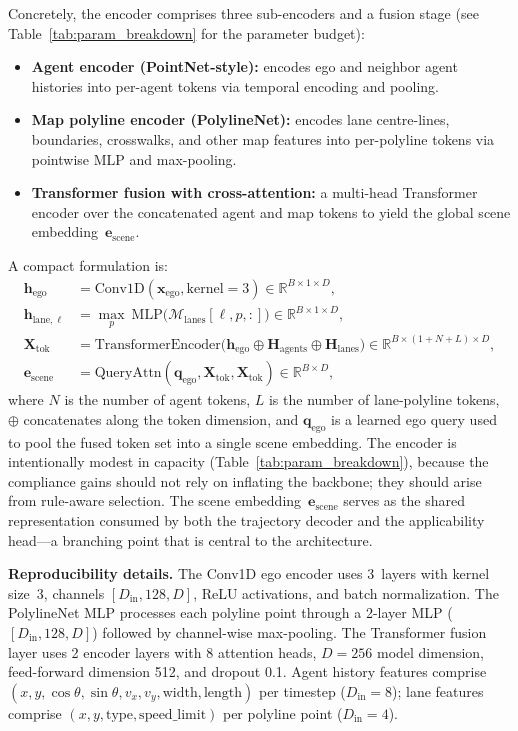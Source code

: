 Concretely, the encoder comprises three sub-encoders and a fusion stage (see Table~\ref{tab:param_breakdown} for the parameter budget):
\begin{itemize}
    \item \textbf{Agent encoder (PointNet-style):} encodes ego and neighbor agent histories into per-agent tokens via temporal encoding and pooling.     
    \item \textbf{Map polyline encoder (PolylineNet):} encodes lane centre-lines, boundaries, crosswalks, and other map features into per-polyline tokens via pointwise MLP and max-pooling.
    \item \textbf{Transformer fusion with cross-attention:} a multi-head Transformer encoder over the concatenated agent and map tokens to yield the global scene embedding~$\mathbf{e}_{\text{scene}}$.
\end{itemize}

\noindent
A compact formulation is:
\begin{align}
\mathbf{h}_{\text{ego}} &= \text{Conv1D}(\mathbf{x}_{\text{ego}}, \text{kernel}=3) \in \mathbb{R}^{B\times 1\times D}, \\
\mathbf{h}_{\text{lane},\ell} &= \max_{p}\ \text{MLP}\big(\mathcal{M}_{\text{lanes}}[\ell,p,:]\big) \in \mathbb{R}^{B\times 1\times D}, \\
\mathbf{X}_{\text{tok}} &= \text{TransformerEncoder}\big(\mathbf{h}_{\text{ego}} \oplus
\mathbf{H}_{\text{agents}} \oplus \mathbf{H}_{\text{lanes}}\big) \in \mathbb{R}^{B\times (1+N+L)\times D}, \\
\mathbf{e}_{\text{scene}} &= \text{QueryAttn}(\mathbf{q}_{\text{ego}}, \mathbf{X}_{\text{tok}}, \mathbf{X}_{\text{tok}}) \in \mathbb{R}^{B\times D},
\end{align}
where $N$ is the number of agent tokens, $L$ is the number of lane-polyline tokens, $\oplus$ concatenates along the token dimension, and $\mathbf{q}_{\text{ego}}$ is a learned ego query used to pool the fused token set into a single scene embedding.  The encoder is intentionally modest in capacity (Table~\ref{tab:param_breakdown}), because the compliance gains should not rely on inflating the backbone; they should arise from rule-aware selection. The scene embedding~$\mathbf{e}_{\text{scene}}$ serves as the shared representation consumed by both the trajectory decoder and the applicability head---a branching point that is central to the architecture. 

\textbf{Reproducibility details.}
The Conv1D ego encoder uses 3~layers with kernel size~3, channels $[D_\text{in}, 128, D]$, ReLU activations, and batch normalization.  The PolylineNet MLP processes each polyline point through a 2-layer MLP ($[D_\text{in}, 128, D]$) followed by channel-wise max-pooling.  The Transformer fusion layer uses 2 encoder layers with 8 attention heads, $D{=}256$ model dimension, feed-forward dimension 512, and dropout 0.1. Agent history features comprise $(x, y, \cos\theta, \sin\theta, v_x, v_y, \text{width}, \text{length})$ per timestep ($D_\text{in}{=}8$); lane features comprise $(x, y, \text{type}, \text{speed\_limit})$ per polyline point ($D_\text{in}{=}4$).

